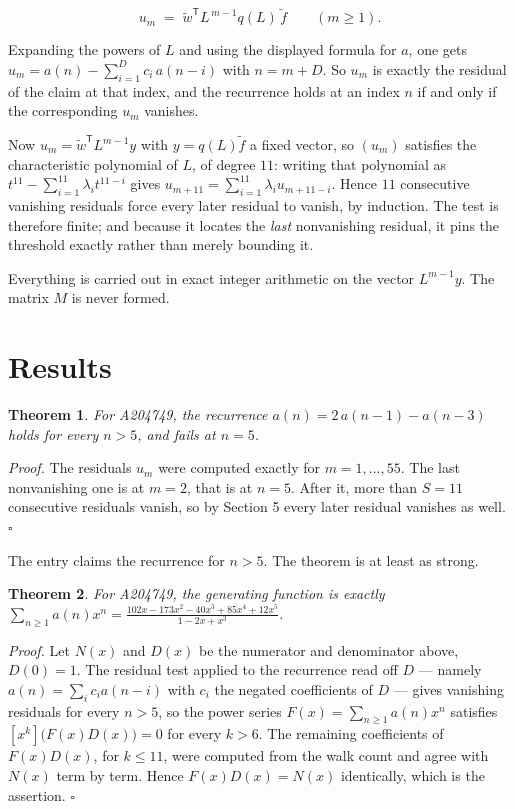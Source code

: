 \documentclass[11pt]{article}
\newtheorem{theorem}{Theorem}
\theoremstyle{definition}
\begin{document}
\[u_m \;=\; \tilde w^{\mathsf T} L^{\,m-1} q(L)\,\tilde f \qquad (m \ge 1).\]

Expanding the powers of $L$ and using the displayed formula for $a$, one gets $u_m = a(n) - \sum_{i=1}^{D} c_i\,a(n-i)$ with $n = m + D$. So $u_m$ is exactly the residual of the claim at that index, and the recurrence holds at an index $n$ if and only if the corresponding $u_m$ vanishes.

Now $u_m = \tilde w^{\mathsf T} L^{m-1} y$ with $y = q(L)\tilde f$ a fixed vector, so $(u_m)$ satisfies the characteristic polynomial of $L$, of degree $11$: writing that polynomial as $t^{11} - \sum_{i=1}^{11} \lambda_i t^{11-i}$ gives $u_{m+11} = \sum_{i=1}^{11} \lambda_i u_{m+11-i}$. Hence $11$ consecutive vanishing residuals force every later residual to vanish, by induction. The test is therefore finite; and because it locates the {\itshape last} nonvanishing residual, it pins the threshold exactly rather than merely bounding it.

Everything is carried out in exact integer arithmetic on the vector $L^{m-1}y$. The matrix $M$ is never formed.

\section{Results}

\begin{theorem} For A204749, the recurrence $a(n) = 2\,a(n-1) - a(n-3)$ holds for every $n > 5$, and fails at $n = 5$.\end{theorem}

{\itshape Proof.} The residuals $u_m$ were computed exactly for $m = 1,\dots,55$. The last nonvanishing one is at $m = 2$, that is at $n = 5$. After it, more than $S = 11$ consecutive residuals vanish, so by Section 5 every later residual vanishes as well. $\square$

The entry claims the recurrence for $n > 5$. The theorem is at least as strong.

\begin{theorem} For A204749, the generating function is exactly $\sum_{n\ge 1} a(n)x^n = \frac{102x - 173x^{2} - 40x^{3} + 85x^{4} + 12x^{5}}{1 - 2x + x^{3}}$.\end{theorem}

{\itshape Proof.} Let $N(x)$ and $D(x)$ be the numerator and denominator above, $D(0)=1$. The residual test applied to the recurrence read off $D$ --- namely $a(n) = \sum_i c_i a(n-i)$ with $c_i$ the negated coefficients of $D$ --- gives vanishing residuals for every $n > 5$, so the power series $F(x)=\sum_{n\ge 1}a(n)x^n$ satisfies $[x^k]\bigl(F(x)D(x)\bigr) = 0$ for every $k > 6$. The remaining coefficients of $F(x)D(x)$, for $k \le 11$, were computed from the walk count and agree with $N(x)$ term by term. Hence $F(x)D(x) = N(x)$ identically, which is the assertion. $\square$
\end{document}
